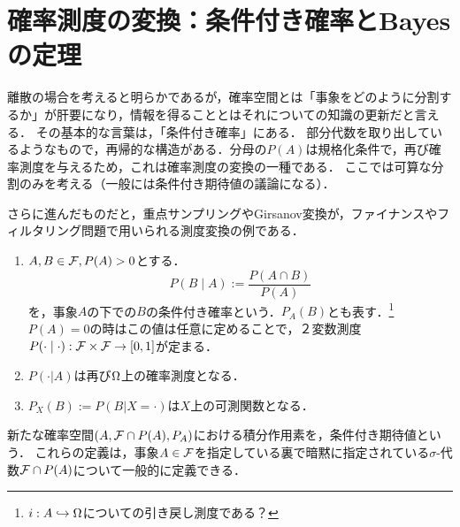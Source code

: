 \documentclass[uplatex,dvipdfmx]{jsreport}
\begin{document}
\section{確率測度の変換：条件付き確率とBayesの定理}

\begin{tcolorbox}[colframe=ForestGreen, colback=ForestGreen!10!white,breakable,colbacktitle=ForestGreen!40!white,coltitle=black,fonttitle=\bfseries\sffamily,
title=確率空間の万華鏡による拡大]
    離散の場合を考えると明らかであるが，確率空間とは「事象をどのように分割するか」が肝要になり，情報を得ることとはそれについての知識の更新だと言える．
    その基本的な言葉は，「条件付き確率」にある．
    部分代数を取り出しているようなもので，再帰的な構造がある．分母の$P(A)$は規格化条件で，再び確率測度を与えるため，これは確率測度の変換の一種である．
    ここでは可算な分割のみを考える（一般には条件付き期待値の議論になる）．

    さらに進んだものだと，重点サンプリングやGirsanov変換が，ファイナンスやフィルタリング問題で用いられる測度変換の例である．
\end{tcolorbox}

\begin{definition}\label{def-conditional-probability}\mbox{}
    \begin{enumerate}
        \item $A,B\in\mathcal{F},P(A)>0$とする．
        \[P(B\mid A):=\frac{P(A\cap B)}{P(A)}\]
        を，事象$A$の下での$B$の条件付き確率という．$P_A(B)$とも表す．\footnote{$i:A\hookrightarrow\Omega$についての引き戻し測度である？}
        $P(A)=0$の時はこの値は任意に定めることで，２変数測度$P(\cdot\mid\cdot):\mathcal{F}\times\mathcal{F}\to[0,1]$が定まる．
        \item $P(\cdot|A)$は再び$\Omega$上の確率測度となる．
        \item $P_X(B):=P(B|X=\cdot)$は$X$上の可測関数となる．
    \end{enumerate}
\end{definition}
\begin{remark}
    新たな確率空間$(A,\mathcal{F}\cap P(A),P_A)$における積分作用素を，条件付き期待値という．
    これらの定義は，事象$A\in\mathcal{F}$を指定している裏で暗黙に指定されている$\sigma$-代数$\mathcal{F}\cap P(A)$について一般的に定義できる．
\end{remark}
\end{document}
